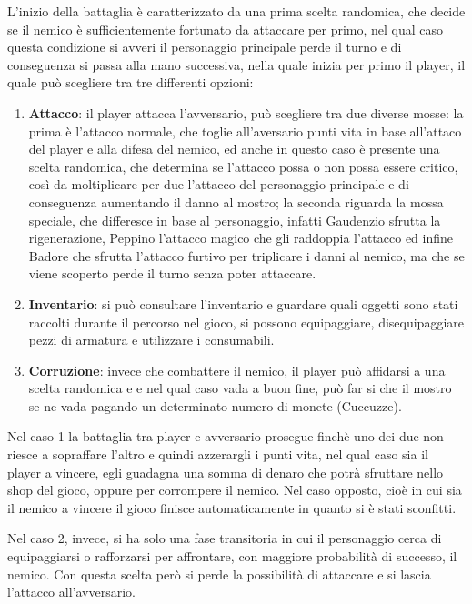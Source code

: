 \documentclass[12pt]{report}
\begin{document}
L'inizio della battaglia è caratterizzato da una prima scelta randomica, che decide se il nemico è sufficientemente
fortunato da attaccare per primo, nel qual caso questa condizione si avveri il  personaggio principale perde il turno e
di conseguenza si passa alla mano successiva, nella quale inizia per primo il player, il quale può scegliere tra tre
differenti opzioni:
\begin{enumerate}

    \item \textbf{Attacco}: il player attacca l'avversario, può scegliere tra due diverse mosse: la prima è l'attacco normale, che
    toglie all'aversario punti vita in base all'attaco del player e alla difesa del nemico, ed anche in questo caso è
    presente una scelta randomica, che determina se l'attacco possa o non possa essere critico, così da moltiplicare per due
    l'attacco del personaggio principale e di conseguenza aumentando il danno al mostro; la seconda riguarda la mossa
    speciale, che differesce in base al personaggio, infatti Gaudenzio sfrutta la rigenerazione, Peppino l'attacco magico
    che gli raddoppia l'attacco ed infine Badore che sfrutta l'attacco furtivo per triplicare i danni al nemico, ma che se
    viene scoperto perde il turno senza poter attaccare.

    \item \textbf{Inventario}: si può consultare l'inventario e guardare quali oggetti sono stati raccolti durante il percorso nel
    gioco, si possono equipaggiare, disequipaggiare pezzi di armatura e utilizzare i consumabili.

    \item \textbf{Corruzione}: invece che combattere il nemico, il player può affidarsi a una scelta randomica e e nel qual caso vada a
    buon fine, può far si che il mostro se ne vada pagando un determinato numero di monete (Cuccuzze).
\end{enumerate}


Nel caso 1 la battaglia tra player e avversario prosegue finchè uno dei due non riesce a sopraffare l'altro e quindi
azzerargli i punti vita, nel qual caso sia il player a vincere, egli guadagna una somma di denaro che potrà sfruttare
nello shop del gioco, oppure per corrompere il nemico.  Nel caso opposto, cioè in cui sia il nemico a vincere il gioco
finisce automaticamente in quanto si è stati sconfitti.

Nel caso 2, invece, si ha solo una fase transitoria in cui il personaggio cerca di equipaggiarsi o rafforzarsi per
affrontare, con maggiore probabilità di successo, il nemico. Con questa scelta però si perde la possibilità di attaccare
e si lascia l'attacco all'avversario.
\end{document}
